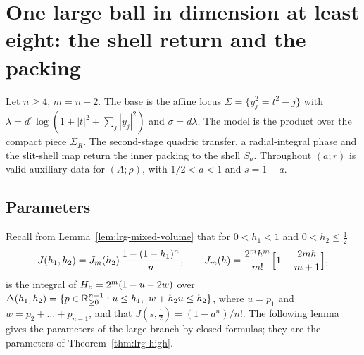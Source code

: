 \section{One large ball in dimension at least eight: the shell return and the packing}\label{sec:two}

Let $n\ge4$, $m=n-2$. The base is the affine locus $\Sigma=\{y_j^2=t^2-j\}$ with
$\lambda=d^c\log(1+|t|^2+\sum_j|y_j|^2)$ and $\sigma=d\lambda$.
The model is the product over the compact piece $\Sigma_R$. The second-stage quadric transfer, a radial-integral
phase and the slit-shell map return the inner packing to the shell $S_a$. Throughout $(a;r)$ is valid auxiliary data for $(A;\rho)$, with $1/2<a<1$ and $s=1-a$.

\subsection{Parameters}\label{sec:two-parameters}

Recall from Lemma~\ref{lem:lrg-mixed-volume} that for $0<h_1<1$ and $0<h_2\le\frac12$
\[
 J(h_1,h_2)=J_m(h_2)\,\frac{1-(1-h_1)^n}{n},\qquad J_m(h)=\frac{2^mh^m}{m!}\Bigl[1-\frac{2mh}{m+1}\Bigr],
\]
is the integral of $H_{\mathrm b}=2^m(1-u-2w)$ over $\Delta(h_1,h_2)=\{p\in\mathbb{R}^{n-1}_{\ge0}:u\le h_1,\ w+h_2u\le h_2\}$, where
$u=p_1$ and $w=p_2+\dots+p_{n-1}$, and that $J(s,\frac12)=(1-a^n)/n!$. The following lemma gives the parameters of the
large branch by closed formulas; they are the parameters of Theorem~\ref{thm:lrg-high}.

